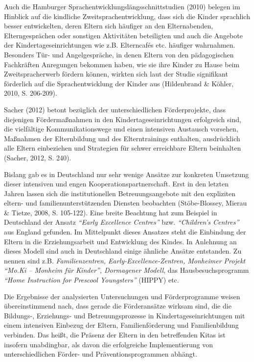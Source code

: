 \documentclass[12pt,a4paper]{article}
\begin{document}
	Auch die Hamburger Sprachentwicklungslängsschnittstudien (2010) belegen im Hinblick auf die kindliche Zweitsprachentwicklung, dass sich die Kinder sprachlich besser entwickelten, deren Eltern sich häufiger an den Elternabenden, Elterngesprächen oder sonstigen Aktivitäten beteiligten und auch die Angebote der Kindertageseinrichtungen wie z.B. Elterncafés etc. häufiger wahrnahmen. Besonders Tür- und Angelgespräche, in denen Eltern von den pädagogischen Fachkräften Anregungen bekommen haben, wie sie ihre Kinder zu Hause beim Zweitspracherwerb fördern können, wirkten sich laut der Studie signifikant förderlich auf die Sprachentwicklung der Kinder aus (Hildenbrand \& Köhler, 2010, S. 206-209).

Sacher (2012) betont bezüglich der unterschiedlichen Förderprojekte, dass diejenigen Fördermaßnahmen in den Kindertageseinrichtungen erfolgreich sind, die vielfältige Kommunikationswege und einen intensiven Austausch vorsehen, Maßnahmen der Elternbildung und des Elterntrainings enthalten, ausdrücklich alle Eltern einbeziehen und Strategien für schwer erreichbare Eltern beinhalten (Sacher, 2012, S. 240).

	Bislang gab es in Deutschland nur sehr wenige Ansätze zur konkreten Umsetzung dieser intensiven und engen Kooperationspartnerschaft. Erst in den letzten Jahren lassen sich die institutionellen Betreuungsangebote mit den expliziten eltern- und familienunterstützenden Diensten beobachten (Stöbe-Blossey, Mierau \& Tietze, 2008, S. 105-122). Eine breite Beachtung hat zum Beispiel in Deutschland der Ansatz \textit{"`Early Excellence Centres"'} bzw. \textit{"`Children’s Centres"'} aus England gefunden. Im Mittelpunkt dieses Ansatzes steht die Einbindung der Eltern in die Erziehungsarbeit und Entwicklung des Kindes. In Anlehnung an dieses Modell sind auch in Deutschland einige ähnliche Ansätze entstanden. Zu nennen sind z.B. \textit{Familienzentren, Early-Excellence-Zentren, Monheimer Projekt "`Mo.Ki – Monheim für Kinder"', Dormagener Modell}, das Hausbesuchsprogramm  \textit{"`Home Instruction for Prescool Youngsters"'} (HIPPY) etc.
	
Die Ergebnisse der analysierten Untersuchungen und Förderprogramme weisen übereinstimmend nach, dass gerade die Förderansätze wirksam sind, die die Bildungs-, Erziehungs- und Betreuungsprozesse in Kindertageseinrichtungen mit einem intensiven Einbezug der Eltern, Familienförderung und Familienbildung verbinden. Das heißt, die Präsenz der Eltern in den betreffenden Kitas ist insofern unabdingbar, als davon die erfolgreiche Implementierung von unterschiedlichen Förder- und Präventionsprogrammen abhängt.
\end{document}
